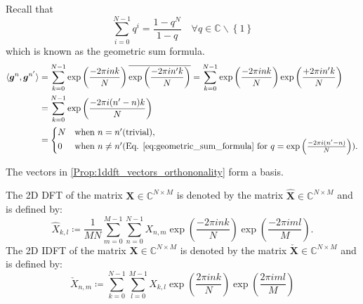 \begin{Proof}\label{proof:1ddft_vectors_orthononality}
    Recall that
    \begin{equation}\label{eq:geometric_sum_formula}
        \sum_{i=0}^{N-1} q^i = \frac{1-q^N}{1-q} \quad \forall q \in \mathbb{C}\backslash\left\{1\right\}
    \end{equation}
    which is known as the geometric sum formula. 
    \begin{equation}
    \begin{split} 
        \langle\boldsymbol{g}^n,\boldsymbol{g}^{n'}\rangle &= \sum_{k=0}^{N-1} \exp\left({\frac{-2\pi ink}{N}}\right)\overline{\exp\left({\frac{-2\pi in'k}{N}}\right)}
        = \sum_{k=0}^{N-1} \exp\left({\frac{-2\pi ink}{N}}\right)\exp\left({\frac{+2\pi in'k}{N}}\right)\\
        &= \sum_{k=0}^{N-1} \exp\left({\frac{-2\pi i(n'-n)k}{N}}\right)\\
        &=
        \begin{cases}
            N & \text{when $n = n'$}\text{(trivial)},\\
            0 & \text{when $n\neq n'$}\text{(Eq. \ref{eq:geometric_sum_formula} for $q = \exp\left({\frac{-2\pi i(n'-n)}{N}}\right)$)}.
        \end{cases}
    \end{split}
\end{equation}
\end{Proof}

\begin{Prop}
    The vectors in \cref{Prop:1ddft_vectors_orthononality} form a basis.
\end{Prop}
\begin{Def}\label{def:2ddft_2didft}
    The 2D \ac{DFT} of the matrix $\boldsymbol{X} \in \mathbb{C}^{N \times M}$ is denoted by 
    the matrix $\hat {\boldsymbol{X}} \in \mathbb{C}^{N \times M}$ and is defined by:
    \begin{equation}\label{eq:2ddft}
        {\hat X}_{k,l} \coloneqq \frac{1}{MN}\sum_{m=0}^{M-1}\sum_{n=0}^{N-1} X_{n,m}\exp\left({\frac{-2\pi ink}{N}}\right)\exp\left({\frac{-2\pi iml}{M}}\right).
    \end{equation}
    The 2D \ac{IDFT} of the matrix $\boldsymbol{X} \in \mathbb{C}^{N \times M}$ is denoted by 
    the matrix $\check {\boldsymbol{X}} \in \mathbb{C}^{N \times M}$ and is defined by:
    \begin{equation}\label{eq:2didft}
        \check X_{n,m} \coloneqq \sum_{k=0}^{N-1}\sum_{l=0}^{M-1}X_{k,l}\exp\left({\frac{2\pi ink}{N}}\right)\exp\left({\frac{2\pi iml}{M}}\right)
    \end{equation}    
\end{Def}

